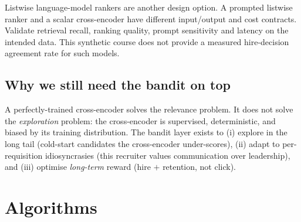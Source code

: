 \documentclass[11pt,oneside]{scrbook}
\begin{document}
Listwise language-model rankers are another design option. A prompted
listwise ranker and a scalar cross-encoder have different input/output and
cost contracts. Validate retrieval recall, ranking quality, prompt sensitivity
and latency on the intended data. This synthetic course does not provide a
measured hire-decision agreement rate for such models.

\section{Why we still need the bandit on top}

A perfectly-trained cross-encoder solves the relevance problem. It does
not solve the \emph{exploration} problem: the cross-encoder is supervised,
deterministic, and biased by its training distribution. The bandit layer
exists to (i) explore in the long tail (cold-start candidates the
cross-encoder under-scores), (ii) adapt to per-requisition idiosyncrasies
(this recruiter values communication over leadership), and (iii) optimise
\emph{long-term} reward (hire $+$ retention, not click).

\chapter{Algorithms}

\begin{algorithm}[H]
\caption{Two-tower retrieval with in-batch-negatives InfoNCE}\label{alg:tt}
\DontPrintSemicolon
{}
\end{algorithm}

\begin{algorithm}[H]
\caption{LinTS contextual-bandit reranker}\label{alg:rerank}
\DontPrintSemicolon
{}
\end{algorithm}
\end{document}

